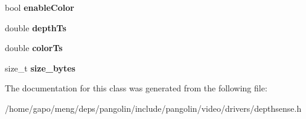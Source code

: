 \begin{DoxyCompactItemize}
\item 
bool {\bfseries enable\+Color}\hypertarget{classpangolin_1_1_depth_sense_video_a63be548747807cd64b465cd38053342c}{}\label{classpangolin_1_1_depth_sense_video_a63be548747807cd64b465cd38053342c}

\item 
double {\bfseries depth\+Ts}\hypertarget{classpangolin_1_1_depth_sense_video_ab81444a7895bcfd83ea42968f9b81387}{}\label{classpangolin_1_1_depth_sense_video_ab81444a7895bcfd83ea42968f9b81387}

\item 
double {\bfseries color\+Ts}\hypertarget{classpangolin_1_1_depth_sense_video_abcd55c1cba7c4172811b3eac378b00ab}{}\label{classpangolin_1_1_depth_sense_video_abcd55c1cba7c4172811b3eac378b00ab}

\item 
size\+\_\+t {\bfseries size\+\_\+bytes}\hypertarget{classpangolin_1_1_depth_sense_video_a67fb6c0cfa3323df304e85911c735168}{}\label{classpangolin_1_1_depth_sense_video_a67fb6c0cfa3323df304e85911c735168}

\end{DoxyCompactItemize}


The documentation for this class was generated from the following file\+:\begin{DoxyCompactItemize}
\item 
/home/gapo/meng/deps/pangolin/include/pangolin/video/drivers/depthsense.\+h\end{DoxyCompactItemize}
